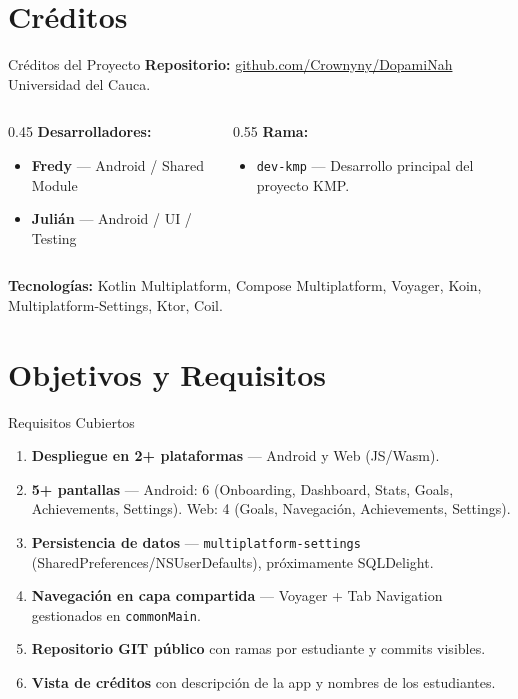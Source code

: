 \documentclass[aspectratio=169]{beamer}
\begin{document}
\section{Créditos}
\begin{frame}{Créditos del Proyecto}
  \textbf{Repositorio:} \href{https://github.com/Crownyny/DopamiNah}{github.com/Crownyny/DopamiNah} \\
  Universidad del Cauca.

  \vspace{0.5cm}
  \begin{columns}[T]
    \begin{column}{0.45\textwidth}
      \textbf{Desarrolladores:}
      \begin{itemize}
        \item \textbf{Fredy} — Android / Shared Module
        \item \textbf{Julián} — Android / UI / Testing
      \end{itemize}
    \end{column}
    \begin{column}{0.55\textwidth}
      \textbf{Rama:}
      \begin{itemize}
        \item \texttt{dev-kmp} — Desarrollo principal del proyecto KMP.
      \end{itemize}
    \end{column}
  \end{columns}

  \vspace{0.4cm}
  \textbf{Tecnologías:} Kotlin Multiplatform, Compose Multiplatform, Voyager, Koin,
  Multiplatform-Settings, Ktor, Coil.
\end{frame}

\section{Objetivos y Requisitos}
\begin{frame}{Requisitos Cubiertos}
  \begin{enumerate}
    \item[\checkmark] \textbf{Despliegue en 2+ plataformas} — Android y Web (JS/Wasm).
    \item[\checkmark] \textbf{5+ pantallas} — Android: 6 (Onboarding, Dashboard, Stats, Goals, Achievements, Settings). Web: 4 (Goals, Navegaci\'on, Achievements, Settings).
    \item[\checkmark] \textbf{Persistencia de datos} — \texttt{multiplatform-settings} (SharedPreferences/NSUserDefaults), próximamente SQLDelight.
    \item[\checkmark] \textbf{Navegación en capa compartida} — Voyager + Tab Navigation gestionados en \texttt{commonMain}.
    \item[\checkmark] \textbf{Repositorio GIT público} con ramas por estudiante y commits visibles.
    \item[\checkmark] \textbf{Vista de créditos} con descripción de la app y nombres de los estudiantes.
  \end{enumerate}
\end{frame}
\end{document}
